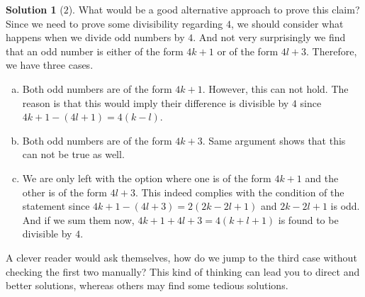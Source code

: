 \documentclass[a4paper, leqno]{article}
\theoremstyle{definition}
\newtheorem*{solution}{Solution}
\theoremstyle{remark}
\begin{document}
		\begin{solution}[$2$]
			What would be a good alternative approach to prove this claim? Since we need to prove some divisibility regarding $4$, we should consider what happens when we divide odd numbers by $4$. And not very surprisingly we find that an odd number is either of the form $4k+1$ or of the form $4l+3$. Therefore, we have three cases.
				\begin{enumerate}[(a)]
					\item Both odd numbers are of the form $4k+1$. However, this can not hold. The reason is that this would imply their difference is divisible by $4$ since $4k+1-(4l+1)=4(k-l)$.
					\item Both odd numbers are of the form $4k+3$. Same argument shows that this can not be true as well.
					\item We are only left with the option where one is of the form $4k+1$ and the other is of the form $4l+3$. This indeed complies with the condition of the statement since $4k+1-(4l+3)=2(2k-2l+1)$ and $2k-2l+1$ is odd. And if we sum them now, $4k+1+4l+3=4(k+l+1)$ is found to be divisible by $4$.
				\end{enumerate}
		\end{solution}
	A clever reader would ask themselves, how do we jump to the third case without checking the first two manually? This kind of thinking can lead you to direct and better solutions, whereas others may find some tedious solutions.
\end{document}
